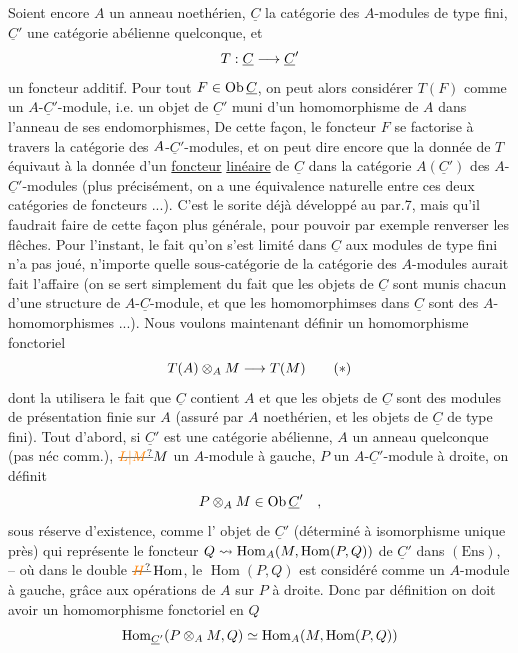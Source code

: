 Soient encore $A$ un anneau noethérien, $\underline C$ la catégorie des $A$-modules\deleted{\unsure{,}}
de type fini, $\underline C'$ une catégorie abélienne quelconque, et
\[
T:\underline C\longrightarrow\underline C'
\]
un foncteur additif. Pour tout $F\in\mathrm{Ob}\,\underline C$, on peut alors considérer $T(F)$
comme un $A$-$\underline C'$-module, i.e. un objet de $\underline C'$ muni d'un homomorphisme de
$A$ dans l'anneau de ses endomorphismes, De cette façon, le foncteur $F$ se
factorise à travers la catégorie des $A$-$\underline C'$-modules, et on peut dire encore
que la donnée de $T$ équivaut à la donnée d'un \uline{foncteur} \uline{linéaire} de $\underline C$ dans
la catégorie  $A(\underline C')$ des $A$-$\underline C'$-modules (plus précisément,  on a une
équivalence naturelle entre ces deux catégories de foncteurs ...). C'est
le sorite déjà développé au par.7, mais qu'il faudrait faire de cette
façon plus générale, pour pouvoir par exemple renverser les flêches. Pour
l'instant, le fait qu'on s'est limité dans $\underline C$ aux modules de type fini
n'a pas joué, n'importe quelle sous-catégorie  de la catégorie des $A$-modules
aurait fait l'affaire (on se sert simplement du fait que les objets de $\underline C$
sont munis  chacun d'une structure de $A$-$\underline C$-module, et que
les homomorphimses dans $\underline C$ sont des $A$-homomorphismes ...). Nous voulons
maintenant définir un homomorphisme fonctoriel
\[
T(A)\otimes_A M\handwritten{\longrightarrow}T(M)\tag*{\handwritten{$(*)$}}
\]
dont la  utilisera le fait que  $\underline C$ contient $A$ et que
les objets de $\underline C$ sont des modules de présentation finie sur $A$ (assuré par
$A$ noethérien, et les objets de $\underline C$ de type fini). Tout d'abord, si $\underline C'$ est
une catégorie abélienne, $A$ un anneau quelconque (pas néc comm.),  $\deleted{\unsure{L|M}}\handwritten{M}$ un
$A$-module à gauche, $P$ un $A$-$\underline C'$-module à droite, on définit
\[
P\otimes_A M\in\mathrm{Ob}\,\underline C'\quad,
\]
sous réserve d'existence, comme l' objet de $\underline C'$ (déterminé à isomorphisme unique près) qui représente le foncteur %
$Q\leadsto\operatorname{Hom}_A(M,\operatorname{Hom}(P,Q))$ de
$\underline C'$ dans $(\mathrm{Ens})$, -- où\handwritten{,} dans le double $\deleted{\unsure{H}}\operatorname{Hom}$, le $\operatorname{Hom}(P,Q)$ est considéré
comme un $A$-module à gauche, grâce aux opérations de $A$ sur $P$ à droite. Donc
par définition on doit avoir un homomorphisme fonctoriel en $Q$
\[
\operatorname{Hom}_{\underline C'}(P\otimes_A M,Q)\simeq\operatorname{Hom}_A(M,\operatorname{Hom}(P,Q))
\]

